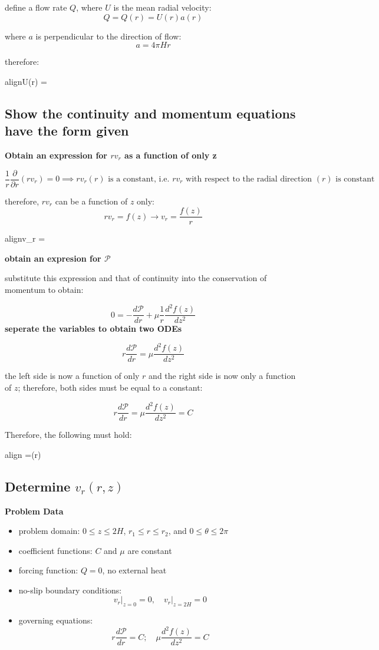 \documentclass[letterpaper, 10pt, oneside]{article}
\newenvironment{dd}[1]{
	\noindent
	\textbf{\normalsize{#1}}
	\hspace{0.1in}
	\small
	\rmfamily
	}
	{\medskip}
\newcommand{\bes}{\begin{equation*}}
\newcommand{\ees}{\end{equation*}}
\newcommand{\bdd}{\begin{dd}}
\newcommand{\edd}{\end{dd}}
\newcommand{\boxedeq}[2]{\begin{empheq}[box={\fboxsep=6pt\fbox}]{align}\label{#1}#2\end{empheq}}
\begin{document}
	define a flow rate $Q$, where $U$ is the mean radial velocity:
	\bes Q = Q(r) = U(r) a(r) \ees

	where $a$ is perpendicular to the direction of flow:
	\bes a = 4\pi Hr \ees

	therefore:
	\boxedeq{U}{U(r) = }
\edd

\subsection{Show the continuity and momentum equations have the form given}

\bdd{Obtain an expression for $rv_r$ as a function of only z}

	\bes \frac{1}{r} \frac{\partial}{\partial r} \left( r v_r \right) = 0 \implies  r v_r(r) \text{ is a constant, i.e. 
	$rv_r$ with respect to the radial direction $(r)$ is constant} \ees

	therefore, $rv_r$ can be a function of $z$ only:
	\bes r v_r = f(z) \rightarrow v_r =  \ees

	\boxedeq{vr}{v_r = \frac{f(z)}{r}}
\edd

\bdd{obtain an expresion for $\mathscr{P}$}

	substitute this expression and that of continuity into the conservation of momentum to obtain:

	\bes 0 = -\frac{d\mathscr{P}}{dr} + \mu  \frac{1}{r} \frac{d^2 f(z)}{d z^2}  \ees
\edd
\bdd{seperate the variables to obtain two ODEs}
	
	\bes r\frac{d\mathscr{P}}{dr} = \mu \frac{d^2 f(z)}{d z^2}  \ees

	the left side is now a function of only $r$ and the right side is now only a function of $z$; therefore, both sides must be equal to a constant:

	\bes r\frac{d\mathscr{P}}{dr} = \mu \frac{d^2 f(z)}{d z^2}  = C \ees

	Therefore, the following must hold:

	\boxedeq{P}{ =\mathscr{P}(r) } 
\edd

\subsection{Determine $v_r(r,z)$}

\bdd{Problem Data}
	\begin{itemize}
		\item problem domain: $0 \le z \le 2H$, $r_1 \le r \le r_2$, and $0 \le \theta \le 2\pi$
		\item coefficient functions: $C$ and $\mu $ are constant
		\item forcing function: $Q = 0$, no external heat
		\item no-slip boundary conditions: $$ v_r \Bigr|_{z=0} = 0, \quad v_r\Bigr|_{z=2H} = 0$$
		\item governing equations: \bes r\frac{d\mathscr{P}}{dr} = C; \quad \mu \frac{d^2 f(z)}{d z^2}  = C \ees
	\end{itemize}
\edd
\end{document}
